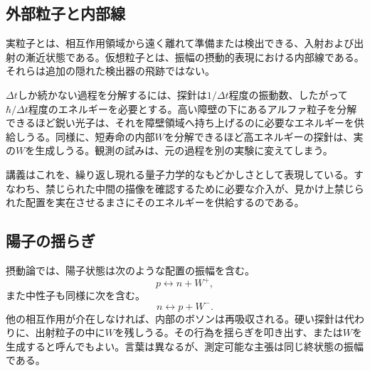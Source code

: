 \subsection{外部粒子と内部線}

実粒子とは、相互作用領域から遠く離れて準備または検出できる、入射および出射の漸近状態である。仮想粒子とは、振幅の摂動的表現における内部線である。それらは追加の隠れた検出器の飛跡ではない。

\begin{classroomqa}
\end{classroomqa}

\(\Delta t\)しか続かない過程を分解するには、探針は\(1/\Delta t\)程度の振動数、したがって\(\hbar/\Delta t\)程度のエネルギーを必要とする。高い障壁の下にあるアルファ粒子を分解できるほど鋭い光子は、それを障壁領域へ持ち上げるのに必要なエネルギーを供給しうる。同様に、短寿命の内部\(W\)を分解できるほど高エネルギーの探針は、実の\(W\)を生成しうる。観測の試みは、元の過程を別の実験に変えてしまう。

講義はこれを、繰り返し現れる量子力学的なもどかしさとして表現している。すなわち、禁じられた中間の描像を確認するために必要な介入が、見かけ上禁じられた配置を実在させるまさにそのエネルギーを供給するのである。

\subsection{陽子の揺らぎ}

摂動論では、陽子状態は次のような配置の振幅を含む。
\begin{equation}
  p\longleftrightarrow n+W^+,
\end{equation}
また中性子も同様に次を含む。
\begin{equation}
  n\longleftrightarrow p+W^-.
\end{equation}
他の相互作用が介在しなければ、内部のボソンは再吸収される。硬い探針は代わりに、出射粒子の中に\(W\)を残しうる。その行為を揺らぎを叩き出す、または\(W\)を生成すると呼んでもよい。言葉は異なるが、測定可能な主張は同じ終状態の振幅である。

\begin{classroomqa}
\end{classroomqa}

